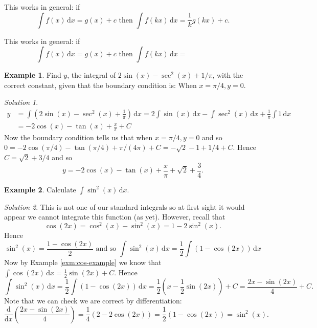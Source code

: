 \documentclass[
  11pt,
  oneside]{book}
\newcommand{\slide}{}
\theoremstyle{definition}
\theoremstyle{definition}
\newtheorem{example}{Example}[chapter]
\theoremstyle{definition}
\theoremstyle{definition}
\theoremstyle{remark}
\newtheorem*{solution}{Solution}
\begin{document}
\begin{notslides}

This works in general: if
\[
\int f(x)\,\mathrm{d}x = g(x) + c\text{ then }\int f(kx)\,\mathrm{d}x = \frac1kg(kx) + c.
\]

\end{notslides}

\begin{slidesonly}

This works in general: if
\[
\int f(x)\,\mathrm{d}x = g(x) + c\text{ then }\int f(kx)\,\mathrm{d}x = \phantom{\frac1kg(kx) + c.}
\]
\slide

\end{slidesonly}

\begin{example}
Find \(y\), the integral of \(2\sin(x) - \sec^2(x)+1/\pi\), with the correct constant, given that the boundary condition is:
When \(x = \pi/4, y = 0\).
\end{example}

\begin{solution}
\begin{align*}
y& = \int(2\sin(x) - \sec^2(x)+\frac1{\pi})\,\mathrm{d}x = 2\int \sin(x)\,\mathrm{d}x - \int \sec^2(x)\,\mathrm{d}x + \frac{1}{\pi}\int 1\,\mathrm{d}x\\
&= -2\cos(x)-\tan(x)+\frac{x}{\pi}+C
\end{align*}
Now the boundary condition tells us that when \(x=\pi/4, y = 0\) and so \(0=-2\cos(\pi/4)-\tan(\pi/4)+\pi/(4\pi)+C = -\sqrt{2}-1+1/4+C\). Hence \(C=\sqrt{2}+3/4\) and so
\[
y = -2\cos(x)-\tan(x)+\frac{x}{\pi}+\sqrt{2}+\frac34.
\]
\end{solution}

\slide

\begin{example}
Calculate \(\displaystyle\int\sin^2(x)\,\mathrm{d}x\).
\end{example}

\begin{solution}
This is not one of our standard integrals so at first sight it would appear we cannot integrate this function (as yet). However, recall that
\[
\cos(2x) = \cos^2(x)-\sin^2(x) = 1-2\sin^2(x).
\]
Hence
\[
\sin^2(x) = \frac{1-\cos(2x)}{2}\text{ and so }\int\sin^2(x)\,\mathrm{d}x = \frac12\int(1-\cos(2x))\,\mathrm{d}x
\]
Now by Example \ref{exm:cos-example} we know that \(\displaystyle\int\cos(2x)\,\mathrm{d}x = \frac12\sin(2x)+C\).
Hence
\[
\int\sin^2(x)\,\mathrm{d}x = \frac12\int(1-\cos(2x))\,\mathrm{d}x = \frac12\left(x-\frac12\sin(2x)\right)+C = \frac{2x-\sin(2x)}{4}+C.
\]
Note that we can check we are correct by differentiation:
\[
\frac{\mathrm{d}}{\mathrm{d}x}\left(\frac{2x-\sin(2x)}{4}\right)=\frac14\left(2-2\cos(2x)\right)=\frac12\left(1-\cos(2x)\right)=\sin^2(x).
\]
\end{solution}
\end{document}
